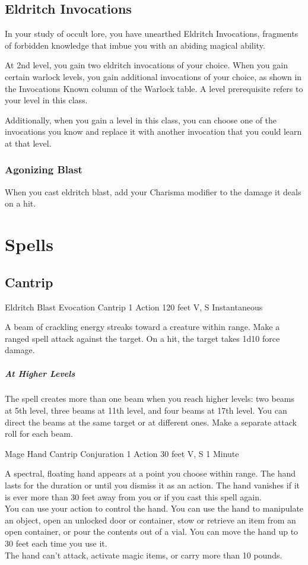 \documentclass[letterpaper,openany,oneside,twocolumn]{book}
\begin{document}
\subsection*{Eldritch Invocations}
In your study of occult lore, you have unearthed Eldritch Invocations, fragments of forbidden knowledge that imbue you with an abiding magical ability.

At 2nd level, you gain two eldritch invocations of your choice. When you gain certain warlock levels, you gain additional invocations of your choice, as shown in the Invocations Known column of the Warlock table. A level prerequisite refers to your level in this class.

Additionally, when you gain a level in this class, you can choose one of the invocations you know and replace it with another invocation that you could learn at that level.
\subsubsection*{Agonizing Blast}
When you cast eldritch blast, add your Charisma modifier to the damage it deals on a hit.

\section*{Spells}
\subsection*{Cantrip}

\DndSpellHeader
  {Eldritch Blast}
  {Evocation Cantrip}
  {1 Action}
  {120 feet}
  {V, S}
  {Instantaneous}
  
A beam of crackling energy streaks toward a creature within range. Make a ranged spell attack against the target. On a hit, the target takes 1d10 force damage.

\subparagraph*{At Higher Levels} The spell creates more than one beam when you reach higher levels: two beams at 5th level, three beams at 11th level, and four beams at 17th level. You can direct the beams at the same target or at different ones. Make a separate attack roll for each beam.

\DndSpellHeader
  {Mage Hand}
  {Cantrip Conjuration}
  {1 Action}
  {30 feet}
  {V, S}
  {1 Minute}
  
A spectral, floating hand appears at a point you choose within range. The hand lasts for the duration or until you dismiss it as an action. The hand vanishes if it is ever more than 30 feet away from you or if you cast this spell again.\\
You can use your action to control the hand. You can use the hand to manipulate an object, open an unlocked door or container, stow or retrieve an item from an open container, or pour the contents out of a vial. You can move the hand up to 30 feet each time you use it.\\
The hand can't attack, activate magic items, or carry more than 10 pounds.
\end{document}
